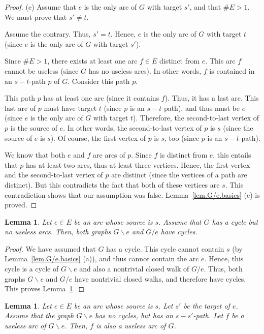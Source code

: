 \documentclass[12pt]{amsart}
\newtheorem{lemma}[theorem]{Lemma}
\theoremstyle{definition}
\begin{document}
\begin{proof}
(e) Assume that $e$ is the only arc of $G$ with target $s'$,
and that $\# E > 1$. We must prove that $s' \neq t$.

Assume the contrary. Thus, $s' = t$.
Hence, $e$ is the only arc of $G$ with target $t$
(since $e$ is the only arc of $G$ with target $s'$).

Since $\# E > 1$, there exists at least one arc $f \in E$
distinct from $e$. This arc $f$ cannot be useless (since $G$
has no useless arcs).
In other words, $f$ is contained in an $s-t$-path $p$ of $G$.
Consider this path $p$.

This path $p$ has at least one arc (since it contains $f$).
Thus, it has a last arc. This last arc of $p$ must have
target $t$ (since $p$ is an $s-t$-path), and thus must be $e$
(since $e$ is the only arc of $G$ with target $t$).
Therefore, the second-to-last vertex of $p$ is the source of $e$.
In other words, the second-to-last vertex of $p$ is $s$
(since the source of $e$ is $s$).
Of course, the first vertex of $p$ is $s$, too (since $p$ is an $s-t$-path).

We know that both $e$ and $f$ are arcs of $p$.
Since $f$ is distinct from $e$, this entails that $p$ has at
least two arcs, thus at least three vertices.
Hence, the first vertex and the second-to-last vertex of $p$ are distinct
(since the vertices of a path are distinct).
But this contradicts the fact that both of these vertices are $s$.
This contradiction shows that our assumption was false.
Lemma~\ref{lem.G/e.basics} (e) is proved.
\end{proof}

\begin{lemma} \label{lem.G/e.B}
    Let $e \in E$ be an arc whose source is $s$.
    Assume that $G$ has a cycle but no useless arcs.
    Then, both graphs $G \backslash e$ and $G / e$ have cycles.
\end{lemma}

\begin{proof}
We have assumed that $G$ has a cycle.
This cycle cannot contain $s$ (by Lemma~\ref{lem.G/e.basics} (a)), and thus cannot contain the arc $e$.
Hence, this cycle is a cycle of $G \backslash e$ and also a nontrivial closed walk of $G / e$.
Thus, both graphs $G \backslash e$ and $G / e$ have nontrivial closed walks,
and therefore have cycles.
This proves Lemma~\ref{lem.G/e.B}.
\end{proof}

\begin{lemma} \label{lem.G-e.C}
    Let $e \in E$ be an arc whose source is $s$.
	Let $s'$ be the target of $e$.
	Assume that the graph $G \backslash e$ has no cycles,
	but has an $s-s'$-path.
	Let $f$ be a useless arc of $G \backslash e$.
	Then, $f$ is also a useless arc of $G$.
\end{lemma}
\end{document}
